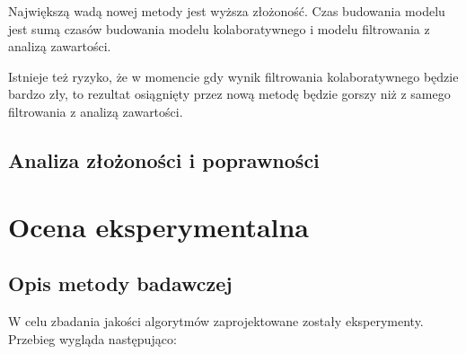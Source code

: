\documentclass[twoside]{iisthesis}
\begin{document}
		 Największą wadą nowej metody jest wyższa złożoność. Czas budowania modelu jest sumą czasów budowania modelu kolaboratywnego i modelu filtrowania z analizą zawartości. 
		 
		 Istnieje też ryzyko, że w momencie gdy wynik filtrowania kolaboratywnego będzie bardzo zły, to rezultat osiągnięty przez nową metodę będzie gorszy niż z samego filtrowania z analizą zawartości. 
	 
	 \section{Analiza złożoności i poprawności}
 
 
\chapter{Ocena eksperymentalna}
	\section{Opis metody badawczej}
	
		W celu zbadania jakości algorytmów zaprojektowane zostały eksperymenty. Przebieg wygląda następująco:
		
\end{document}
